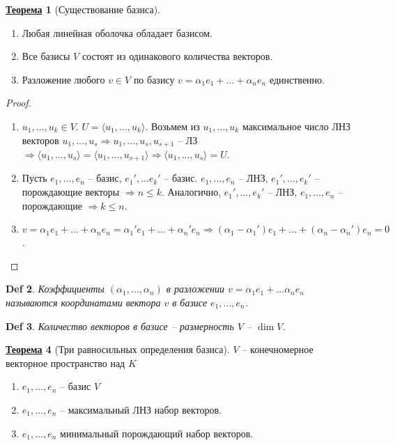 \documentclass[12pt]{article}
\newenvironment{MyList}[1][4pt]{
  \begin{enumerate}[1.]
  \setlength{\parskip}{0pt}
  \setlength{\itemsep}{#1}
}{       
  \end{enumerate}
}
\def\SO{\Rightarrow}     %
\theoremstyle{definition} %
\newtheorem{Thm}{\underline{Теорема}}[subsection] %
\theoremstyle{plain} %
\newtheorem{Def}[Thm]{Def} %
\theoremstyle{remark} %
\begin{document}
{\begin{Thm}[Существование базиса]
    \begin{MyList}
        \item Любая линейная оболочка обладает базисом.
        \item Все базисы $V$ состоят из одинакового количества векторов.
        \item Разложение любого $v \in V$ по базису $v = \alpha_1 e_1 + ... + \alpha_n e_n$ единственно.
    \end{MyList}
\end{Thm}

\begin{proof}
    \begin{MyList}
        \item $u_1, ..., u_k \in V$. $U = \langle u_1, ..., u_k\rangle$. Возьмем из $u_1, ..., u_k$ максимальное число ЛНЗ векторов $u_1, ..., u_s \SO u_1, ..., u_s, u_{s + 1}$ -- ЛЗ $\SO \langle u_1, ..., u_s\rangle = \langle u_1, ..., u_{s + 1}\rangle \SO \langle u_1, ..., u_s\rangle = U$.  
        \item Пусть $e_1, ..., e_n$ -- базис, $e_1', ... e_k'$ -- базис.
        $e_1, ..., e_n$ -- ЛНЗ, $e_1', ..., e_k'$ -- порождающие векторы $\SO n \leqslant k$.
        Аналогично, $e_1', ..., e_k'$ -- ЛНЗ, $e_1, ..., e_n$ -- порождающие $\SO k\leqslant n$.
        
        \item $v = \alpha_1 e_1 + ... + \alpha_n e_n = \alpha_1' e_1 + ... + \alpha_n'e_n \SO (\alpha_1 - \alpha_1') e_1 + ... + (\alpha_n - \alpha_n')e_n = 0$. 
    \end{MyList}
\end{proof}

\begin{Def}
    Коэффициенты $(\alpha_1, ..., \alpha_n)$ в разложении $v = \alpha_1 e_1 + ... \alpha_n e_n$ называются координатами вектора $v$ в базисе $e_1, ..., e_n$. 
\end{Def}

\begin{Def}
    Количество векторов в базисе -- размерность $V$ -- $\dim V$.
\end{Def}

\begin{Thm}[Три равносильных определения базиса]
    $V$ -- конечномерное векторное пространство над $K$
    \begin{MyList}
        \item $e_1, ..., e_n$ -- базис $V$
        \item $e_1, ..., e_n$ -- максимальный ЛНЗ набор векторов.
        \item $e_1, ..., e_n$ минимальный порождающий набор векторов.
    \end{MyList}
\end{Thm}

}
\end{document}
